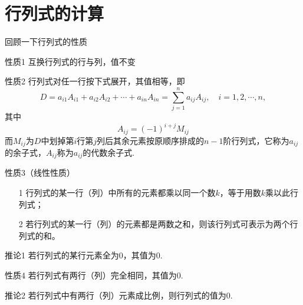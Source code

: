 \section{行列式的计算}

\begin{frame}
  回顾一下行列式的性质
\end{frame}

\begin{frame}
  \begin{block}{性质1}
    互换行列式的行与列，值不变
  \end{block}

  \begin{block}{性质2}  
    行列式对任一行按下式展开，其值相等，即
    $$
    D = a_{i1} A_{i1} + a_{i2} A_{i2} + \cdots + a_{in}A_{in} = \sum_{j=1}^n a_{ij} A_{ij}, \quad
    i = 1, 2, \cdots, n,
    $$
    其中
    $$
    A_{ij} = (-1)^{i+j} M_{ij}
    $$
    而$M_{ij}$为$D$中划掉第$i$行第$j$列后其余元素按原顺序排成的$n-1$阶行列式，它称为$a_{ij}$的余子式，$A_{ij}$称为$a_{ij}$的代数余子式.
  \end{block}

\end{frame}


\begin{frame}
  \begin{block}{性质3（线性性质） }
    \begin{itemize}
    \item[1] 行列式的某一行（列）中所有的元素都乘以同一个数$k$，等于用数$k$乘以此行列式；
    \item[2] 若行列式的某一行（列）的元素都是两数之和，则该行列式可表示为两个行列式的和。
    \end{itemize}
  \end{block}

  \begin{block}{推论1}
    若行列式的某行元素全为0，其值为0.
  \end{block}

\end{frame}

\begin{frame}
  \begin{block}{性质4}
    若行列式有两行（列）完全相同，其值为$0$.
  \end{block}

  \begin{block}{推论2}
    若行列式中有两行（列）元素成比例，则行列式的值为$0$.
  \end{block}

\end{frame}

